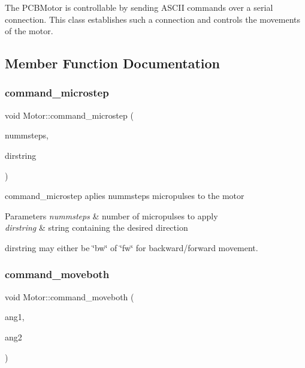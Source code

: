 The P\+C\+B\+Motor is controllable by sending A\+S\+C\+II commands over a serial connection. This class establishes such a connection and controls the movements of the motor. 

\subsection{Member Function Documentation}
\mbox{\label{classMotor_abfbe0b96cfb97107128084ec065e31c2}} 
\subsubsection{\texorpdfstring{command\+\_\+microstep}{command\_microstep}}
{\footnotesize\ttfamily void Motor\+::command\+\_\+microstep (\begin{DoxyParamCaption}\item[{uint16\+\_\+t}]{nummsteps,  }\item[{Q\+String}]{dirstring }\end{DoxyParamCaption})\hspace{0.3cm}{\ttfamily [slot]}}



command\+\_\+microstep aplies nummsteps micropulses to the motor 


\begin{DoxyParams}{Parameters}
{\em nummsteps} & number of micropulses to apply \\
\hline
{\em dirstring} & string containing the desired direction\\
\hline
\end{DoxyParams}
dirstring may either be \char`\"{}bw\char`\"{} of \char`\"{}fw\char`\"{} for backward/forward movement. \mbox{\label{classMotor_a3d179f71c181cbeb3cdb44af166e532d}} 
\subsubsection{\texorpdfstring{command\+\_\+moveboth}{command\_moveboth}}
{\footnotesize\ttfamily void Motor\+::command\+\_\+moveboth (\begin{DoxyParamCaption}\item[{double}]{ang1,  }\item[{double}]{ang2 }\end{DoxyParamCaption})\hspace{0.3cm}{\ttfamily [slot]}}



